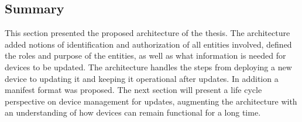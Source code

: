 \documentclass[0-thesis.tex]{subfiles}
\begin{document}
\subsection{Summary}
\label{ssec:architecture-summary}
This section presented the proposed architecture of the thesis. The architecture added
notions of identification and authorization of all entities involved, defined the roles
and purpose of the entities, as well as what information is needed for devices to be
updated. The architecture handles the steps from deploying a new device to updating it and
keeping it operational after updates. In addition a manifest format was proposed. The next
section will present a life cycle perspective on device management for updates, augmenting
the architecture with an understanding of how devices can remain functional for a long
time.
\end{document}
